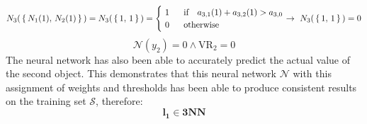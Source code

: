 \documentclass[../main]{subfiles}
\begin{document}
\begin{equation*}
    N_3(\, \{ \, N_1(1), \, N_2(1)\, \} \,) = N_3(\, \{ \, 1, \, 1\, \} \,) = \begin{cases}
  \ 1 \ \ & \text{if } \  \ a_{3,1}(1)+a_{3,2}(1)  >a_{3,0} \\
  \ 0 & \text{otherwise }  
\end{cases}  \rightarrow \ N_3(\, \{ \, 1, \, 1\, \} \,) = 0\vspace{3mm}
\end{equation*}
\begin{equation*}
    \mathcal{N}(y_2) = 0 \land \text{VR}_2 = 0
\end{equation*}
The neural network has also been able to accurately predict the actual value of the second object. This demonstrates that this neural network $\mathcal{N}$ with this assignment of weights and thresholds has been able to produce consistent results on the training set $\mathcal{S}$, therefore:
\begin{equation*}
   \textbf{l}_\textbf{1} \in \textbf{3NN}
\end{equation*}
\end{document}
